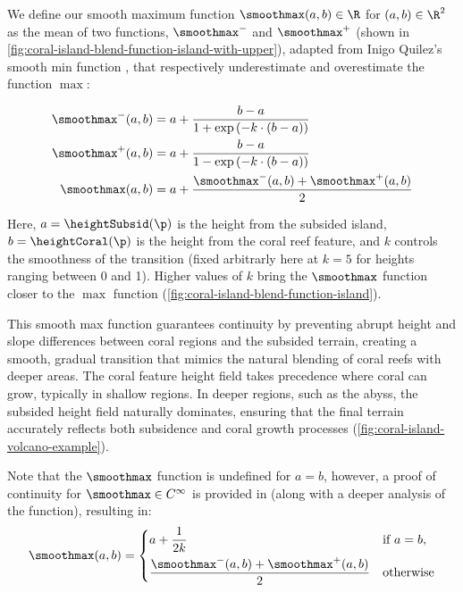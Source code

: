 We define our smooth maximum function $\smoothmax(a, b) \in \R$ for $(a, b) \in \R^2$ as the mean of two functions, $\smoothmax^-$ and $\smoothmax^+$ (shown in \cref{fig:coral-island-blend-function-island-with-upper}), adapted from Inigo Quilez's smooth min function \cite{Quilez2013}, that respectively underestimate and overestimate the function $\max$:

\begin{align}
    \smoothmax^-(a, b) &= a + \frac{b - a}{1 + \exp\left(-k \cdot (b - a) \right)} \\
    \smoothmax^+(a, b) &= a + \frac{b - a}{1 - \exp\left(-k \cdot (b - a) \right)} \\
    \smoothmax(a, b) &= a + \frac{\smoothmax^-(a, b) + \smoothmax^+(a, b)}{2}
\end{align}

Here, $a = \heightSubsid(\p)$ is the height from the subsided island, $b = \heightCoral(\p)$ is the height from the coral reef feature, and $k$ controls the smoothness of the transition (fixed arbitrarly here at $k=5$ for heights ranging between 0 and 1). Higher values of $k$ bring the $\smoothmax$ function closer to the $\max$ function (\cref{fig:coral-island-blend-function-island}).

This smooth max function guarantees continuity by preventing abrupt height and slope differences between coral regions and the subsided terrain, creating a smooth, gradual transition that mimics the natural blending of coral reefs with deeper areas. The coral feature height field takes precedence where coral can grow, typically in shallow regions. In deeper regions, such as the abyss, the subsided height field naturally dominates, ensuring that the final terrain accurately reflects both subsidence and coral growth processes (\cref{fig:coral-island-volcano-example}).

Note that the $\smoothmax$ function is undefined for $a = b$, however, a proof of continuity for $\smoothmax \in C^\infty$ is provided in  (along with a deeper analysis of the function), resulting in:
\begin{align}
    \label{eq:coral-island-smoothmax-function}
    \smoothmax(a, b) = \begin{dcases}
        a + \frac{1}{2k} & \text{if } a = b, \\
        \frac{\smoothmax^-(a, b) + \smoothmax^+(a, b)}{2} & \text{otherwise}
    \end{dcases}
\end{align}

